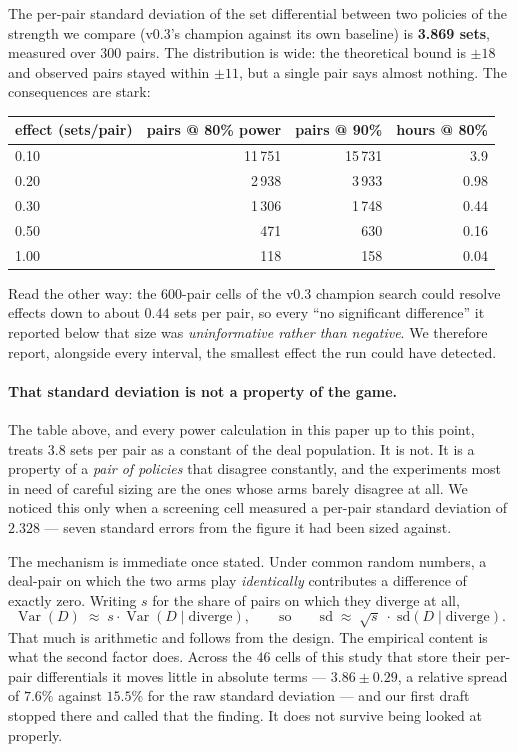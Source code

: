 \documentclass[11pt,a4paper]{article}
\begin{document}
The per-pair standard deviation of the set differential between two policies of
the strength we compare (v0.3's champion against its own baseline) is
\textbf{3.869 sets}, measured over 300 pairs. The distribution is wide: the
theoretical bound is $\pm 18$ and observed pairs stayed within $\pm 11$, but a
single pair says almost nothing. The consequences are stark:

\begin{center}
\small
\begin{tabular}{lrrr}
\toprule
effect (sets/pair) & pairs @ 80\% power & pairs @ 90\% & hours @ 80\% \\
\midrule
0.10 & 11\,751 & 15\,731 & 3.9 \\
0.20 & 2\,938 & 3\,933 & 0.98 \\
0.30 & 1\,306 & 1\,748 & 0.44 \\
0.50 & 471 & 630 & 0.16 \\
1.00 & 118 & 158 & 0.04 \\
\bottomrule
\end{tabular}
\end{center}

Read the other way: the 600-pair cells of the v0.3 champion search could resolve
effects down to about $0.44$ sets per pair, so every ``no significant
difference'' it reported below that size was \emph{uninformative rather than
negative}. We therefore report, alongside every interval, the smallest effect
the run could have detected.

\paragraph{That standard deviation is not a property of the game.} The table
above, and every power calculation in this paper up to this point, treats
$3.8$ sets per pair as a constant of the deal population. It is not. It is a
property of a \emph{pair of policies} that disagree constantly, and the
experiments most in need of careful sizing are the ones whose arms barely
disagree at all. We noticed this only when a screening cell measured a per-pair
standard deviation of $2.328$ --- seven standard errors from the figure it had
been sized against.

The mechanism is immediate once stated. Under common random numbers, a deal-pair
on which the two arms play \emph{identically} contributes a difference of
exactly zero. Writing $s$ for the share of pairs on which they diverge at all,
\[
  \operatorname{Var}(D) \;\approx\; s \cdot \operatorname{Var}(D \mid \text{diverge}),
  \qquad\text{so}\qquad
  \mathrm{sd} \;\approx\; \sqrt{s}\;\cdot\;\mathrm{sd}(D \mid \text{diverge}).
\]
That much is arithmetic and follows from the design. The empirical content is
what the second factor does. Across the $46$ cells of this study that store
their per-pair differentials it moves little in absolute terms --- $3.86 \pm
0.29$, a relative spread of $7.6\%$ against $15.5\%$ for the raw standard
deviation --- and our first draft stopped there and called that the finding. It
does not survive being looked at properly.
\end{document}
